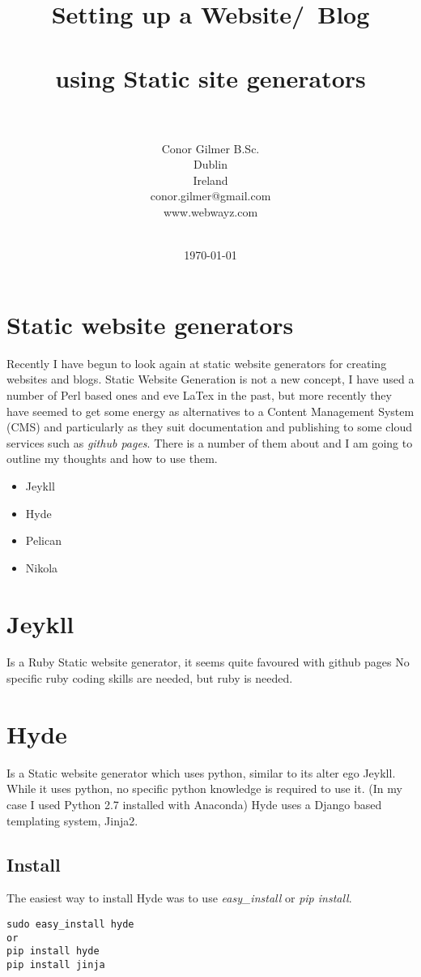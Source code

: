 \documentclass[12pt]{article}			%
\title{Setting up a Website/\ Blog\\~\\ using Static site generators\\~\\}	%
\author{	Conor Gilmer B.Sc.\\	%
		Dublin \\
		Ireland \\
		conor.gilmer@gmail.com\\
		www.webwayz.com\\~\\
		}
\date{\today}				%
\begin{document}
\maketitle
\newpage
\tableofcontents
\newpage

\section{Static website generators}
Recently I have begun to look again at static website generators for creating websites and blogs. Static Website Generation is not a new concept, I have used a number of Perl based ones and eve LaTex in the past, but more recently they have seemed to get some energy as alternatives to a Content Management System (CMS) and particularly as they suit documentation and publishing to some cloud services such as \textit{github pages}. There is a number of them about and I am going to outline my thoughts and how to use them.
\begin{itemize}
\item Jeykll
\item Hyde
\item Pelican
\item Nikola
\end{itemize}


\newpage
\section{Jeykll}
Is a Ruby Static website generator, it seems quite favoured with github pages
No specific ruby coding skills are needed, but ruby is needed.

\newpage
\section{Hyde}
Is a Static website generator which uses python, similar to its alter ego Jeykll.
While it uses python, no specific python knowledge is required to use it. (In my case I used Python 2.7 installed with Anaconda) Hyde uses a Django based templating system, Jinja2. 

\subsection{Install}
The easiest way to install Hyde was to use \textit{easy\_install} or \textit{pip install}.
\begin{verbatim}
sudo easy_install hyde
or
pip install hyde
pip install jinja
\end{verbatim}
\end{document}
